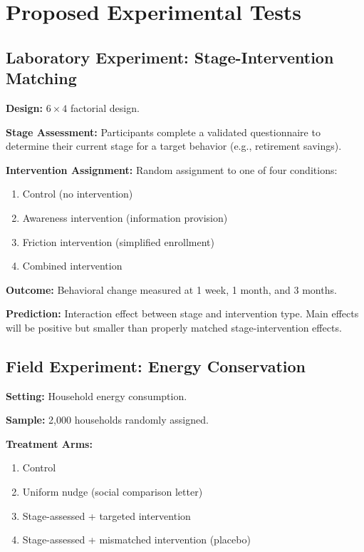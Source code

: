 \documentclass[12pt]{article}
\begin{document}
\section{Proposed Experimental Tests}

\subsection{Laboratory Experiment: Stage-Intervention Matching}

\textbf{Design:} $6 \times 4$ factorial design.

\textbf{Stage Assessment:} Participants complete a validated questionnaire to determine their current stage for a target behavior (e.g., retirement savings).

\textbf{Intervention Assignment:} Random assignment to one of four conditions:
\begin{enumerate}
    \item Control (no intervention)
    \item Awareness intervention (information provision)
    \item Friction intervention (simplified enrollment)
    \item Combined intervention
\end{enumerate}

\textbf{Outcome:} Behavioral change measured at 1 week, 1 month, and 3 months.

\textbf{Prediction:} Interaction effect between stage and intervention type. Main effects will be positive but smaller than properly matched stage-intervention effects.

\subsection{Field Experiment: Energy Conservation}

\textbf{Setting:} Household energy consumption.

\textbf{Sample:} 2,000 households randomly assigned.

\textbf{Treatment Arms:}
\begin{enumerate}
    \item Control
    \item Uniform nudge (social comparison letter)
    \item Stage-assessed + targeted intervention
    \item Stage-assessed + mismatched intervention (placebo)
\end{enumerate}
\end{document}
